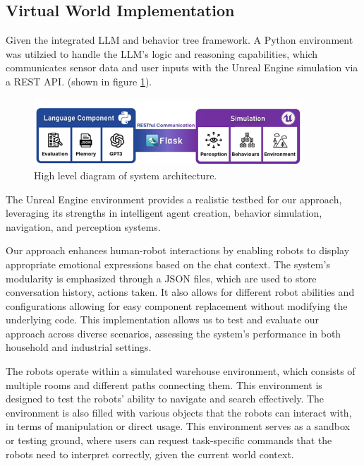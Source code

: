 \documentclass[pdflatex,sn-mathphys-num]{sn-jnl}
\theoremstyle{thmstyleone}
\theoremstyle{thmstyletwo}%
\theoremstyle{thmstylethree}%
\begin{document}
\subsection{Virtual World Implementation}
Given the integrated LLM and behavior tree framework. A Python environment was utilzied  to handle the LLM's logic and reasoning capabilities, which communicates sensor data and user inputs with the Unreal Engine simulation via a REST API. (shown in figure \ref{software}).
\begin{figure}[H]
\centering
\includegraphics[width=0.9\textwidth]{figures/Picture2.png}
\caption{High level diagram of system architecture.}\label{software}
\end{figure}

The Unreal Engine environment provides a realistic testbed for our approach, leveraging its strengths in intelligent agent creation, behavior simulation, navigation, and perception systems.

Our approach enhances human-robot interactions by enabling robots to display appropriate emotional expressions based on the chat context. The system's modularity is emphasized through a JSON files, which are used to store conversation history, actions taken. It also allows for different robot abilities and configurations allowing for easy component replacement without modifying the underlying code.
This implementation allows us to test and evaluate our approach across diverse scenarios, assessing the system's performance in both household and industrial settings. 


The robots operate within a simulated warehouse environment, which consists of multiple rooms and different paths connecting them. This environment is designed to test the robots' ability to navigate and search effectively. The environment is also filled with various objects that the robots can interact with, in terms of manipulation or direct usage. This environment serves as a sandbox or testing ground, where users can request task-specific commands that the robots need to interpret correctly, given the current world context. 
\end{document}
